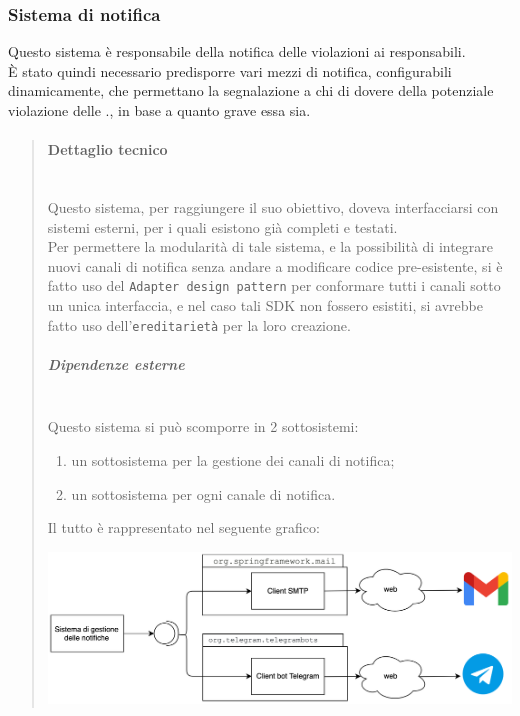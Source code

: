         \subsubsection{Sistema di notifica}
            Questo sistema è responsabile della notifica delle violazioni ai responsabili.\\
            È stato quindi necessario predisporre vari mezzi di notifica, configurabili dinamicamente, che permettano la segnalazione a chi di dovere della potenziale violazione delle ., in base a quanto grave essa sia.
            \begin{quote}
            	\mbox{}%
            	\vspace{-1cm}
                \paragraph{Dettaglio tecnico}
                	 \mbox{}\\
                    Questo sistema, per raggiungere il suo obiettivo, doveva interfacciarsi con sistemi esterni, per i quali esistono già  completi e testati. \\
                    Per permettere la modularità di tale sistema, e la possibilità di integrare nuovi canali di notifica senza andare a modificare codice pre-esistente, si è fatto uso del \texttt{Adapter design pattern} per conformare tutti i canali sotto un unica interfaccia, e nel caso tali SDK non fossero esistiti, si avrebbe fatto uso dell'\texttt{ereditarietà} per la loro creazione.
                    \subparagraph{Dipendenze esterne}
                    \mbox{} \\
                        Questo sistema si può scomporre in 2 sottosistemi:
                        \begin{enumerate}
                            \item un sottosistema per la gestione dei canali di notifica;
                            \item un sottosistema per ogni canale di notifica.
                        \end{enumerate}
                        Il tutto è rappresentato nel seguente grafico:
                        \begin{center}
                            \includegraphics[keepaspectratio = true, width=14cm]{immagini/progettazione/notifica.png}

\end{center}
\end{quote}
